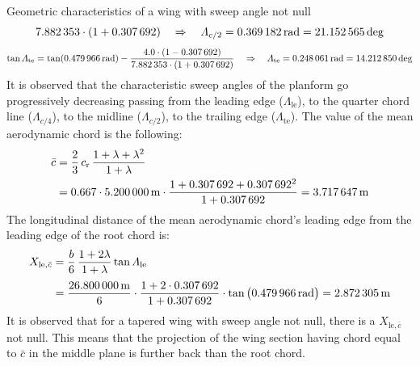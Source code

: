 \documentclass[[12pt,twoside]{book}
\begin{document}
\begin{myExampleX}{Geometric characteristics of a wing with sweep angle not null}{}
\[{      }{
         \num[round-precision=2]{\myAspectRatioWing}
         \cdot (1+\SI[round-precision=2]{\myTaperRatioWing}{})} 
   \quad
   \Rightarrow
   \quad
   \Lambda_{c/2}
      =\SI[round-precision=3]{\myLambdaCHalfRad}{\radian} 
      =\SI[round-precision=1]{\myLambdaCHalfDeg}{\deg} 
\]
%
\[
\tan
\Lambda_\mathrm{te}
   = \tan (\SI[round-precision=3]{\myLambdaLERad}{\radian})
      - \dfrac{
         \num[round-precision=2]{4.0}
         \cdot (1-\SI[round-precision=2]{\myTaperRatioWing}{})
      }{
         \num[round-precision=2]{\myAspectRatioWing}
         \cdot (1+\SI[round-precision=2]{\myTaperRatioWing}{})} 
   \quad
   \Rightarrow
   \quad
   \Lambda_\mathrm{te}
      =\SI[round-precision=3]{\myLambdaTERad}{\radian}
      =\SI[round-precision=1]{\myLambdaTEDeg}{\deg} 
\]
It is observed that the characteristic sweep angles of the planform go progressively decreasing passing from the leading edge ($\Lambda_\mathrm{le}$), 
to the quarter chord line ($\Lambda_{c/4}$),
to the midline ($\Lambda_{c/2}$),
to the trailing edge ($\Lambda_\mathrm{te}$).
The value of the mean aerodynamic chord is the following:
\[
\begin{split}
\bar{c} & {}= \frac{2}{3} \, c_\mathrm{r} \, \frac{1+\lambda + \lambda^2}{1+\lambda} \\
  & {}=
    \num{0.667} \cdot \SI[round-precision=2]{\myChordRootWingMT}{\metre}
      \cdot 
        \frac{
          1 + \SI[round-precision=2]{\myTaperRatioWing}{} + \SI[round-precision=2]{\myTaperRatioWing}{}^2
        }{
          1 + \SI[round-precision=2]{\myTaperRatioWing}{}
        }
    = \SI[round-precision=2]{\myMACWingMT}{\metre} 
\end{split}
\]
The longitudinal distance of the mean aerodynamic chord's leading edge from the leading edge of the root chord is:
\[
\begin{split}
X_{\mathrm{le},\bar{c}} 
  & {}=
    \frac{b}{6} \, \frac{1+2\lambda}{1+\lambda} \tan\Lambda_\mathrm{le} \\[3pt]
  & {}=
    \frac{\SI[round-precision=1]{\mySpanWingMT}{\metre}}{6}
      \cdot 
      \frac{
        1 + 2\cdot\SI[round-precision=2]{\myTaperRatioWing}{}
      }{
        1 + \SI[round-precision=2]{\myTaperRatioWing}{}
      }
      \cdot \tan \big( \SI[round-precision=3]{\myLambdaLERad}{\radian} \big)
    = \SI[round-precision=2]{\myXLEMACWingMT}{\metre} 
\end{split}
\]
It is observed that for a tapered wing with sweep angle not null, there is a
$X_{\mathrm{le},\bar{c}}$ not null. This means that the projection of the wing section having chord equal to $\bar{c}$ in the middle plane is further back than the root chord.

\end{myExampleX}
\end{document}
